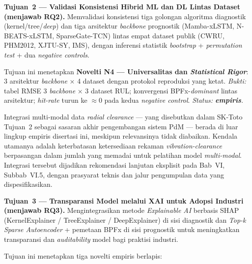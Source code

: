 \medskip

\textbf{Tujuan~2 — Validasi Konsistensi Hibrid ML dan DL Lintas
Dataset (menjawab RQ2).}
Memvalidasi konsistensi tiga golongan algoritma diagnostik
(kernel/tree/\emph{deep}) dan tiga arsitektur \emph{backbone}
prognostik (Mamba-xLSTM, N-BEATS-xLSTM, SparseGate-TCN) lintas
empat dataset publik (CWRU, PHM2012, XJTU-SY, IMS), dengan inferensi
statistik \emph{bootstrap} + \emph{permutation test} + dua
\emph{negative controls}.

Tujuan ini menetapkan \textbf{Novelti N4 — Universalitas dan
\emph{Statistical Rigor}}: 3 arsitektur \emph{backbone} × 4 dataset
dengan protokol reproduksi yang ketat.
\emph{Bukti:} tabel RMSE 3 \emph{backbone} × 3 dataset RUL;
konvergensi BPFx-\emph{dominant} lintas arsitektur; \emph{hit-rate}
turun ke ${\approx}0$ pada kedua \emph{negative control}.
\emph{Status: \textbf{empiris}.}

Integrasi multi-modal data \emph{radial clearance} --- yang
disebutkan dalam SK-Toto Tujuan~2 sebagai sasaran akhir pengembangan
sistem PdM --- berada di luar lingkup empiris disertasi ini, meskipun
relevansinya tidak diabaikan.
Kendala utamanya adalah keterbatasan ketersediaan rekaman
\emph{vibration-clearance} berpasangan dalam jumlah yang memadai
untuk pelatihan model \emph{multi-modal}.
Integrasi tersebut dijadikan rekomendasi lanjutan eksplisit pada
Bab~VI, Subbab~VI.5, dengan prasyarat teknis dan jalur pengumpulan data
yang dispesifikasikan.

\medskip

\textbf{Tujuan~3 — Transparansi Model melalui XAI untuk Adopsi
Industri (menjawab RQ3).}
Mengintegrasikan metode \emph{Explainable AI} berbasis SHAP
(KernelExplainer / TreeExplainer / DeepExplainer) di sisi diagnostik
dan \emph{Top-k Sparse Autoencoder} + pemetaan BPFx di sisi
prognostik untuk meningkatkan transparansi dan \emph{auditability}
model bagi praktisi industri.

Tujuan ini menetapkan tiga novelti empiris berlapis:

